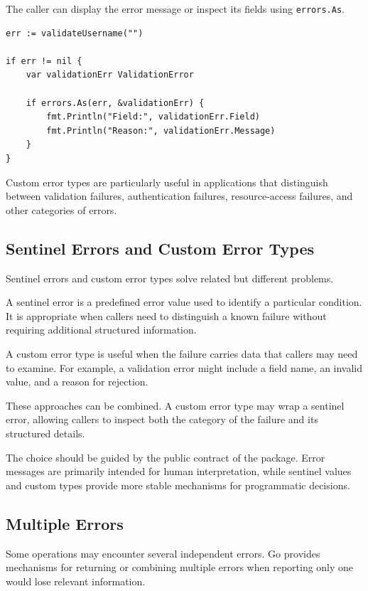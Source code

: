 The caller can display the error message or inspect its fields using \texttt{errors.As}.

\begin{lstlisting}
err := validateUsername("")

if err != nil {
    var validationErr ValidationError

    if errors.As(err, &validationErr) {
        fmt.Println("Field:", validationErr.Field)
        fmt.Println("Reason:", validationErr.Message)
    }
}
\end{lstlisting}

Custom error types are particularly useful in applications that distinguish between validation failures, authentication failures, resource-access failures, and other categories of errors.

\subsection{Sentinel Errors and Custom Error Types}

Sentinel errors and custom error types solve related but different problems.

A sentinel error is a predefined error value used to identify a particular condition. It is appropriate when callers need to distinguish a known failure without requiring additional structured information.

A custom error type is useful when the failure carries data that callers may need to examine. For example, a validation error might include a field name, an invalid value, and a reason for rejection.

These approaches can be combined. A custom error type may wrap a sentinel error, allowing callers to inspect both the category of the failure and its structured details.

The choice should be guided by the public contract of the package. Error messages are primarily intended for human interpretation, while sentinel values and custom types provide more stable mechanisms for programmatic decisions.

\subsection{Multiple Errors}

Some operations may encounter several independent errors. Go provides mechanisms for returning or combining multiple errors when reporting only one would lose relevant information.

